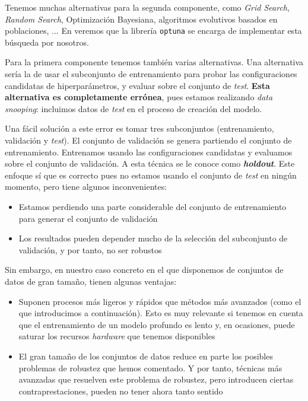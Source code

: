 Tenemos muchas alternativas para la segunda componente, como \textit{Grid Search}, \textit{Random Search}, Optimización Bayesiana, algoritmos evolutivos basados en poblaciones, ... \cite{informatica:review_algoritmos_hp} En  veremos que la librería \lstinline{optuna} se encarga de implementar esta búsqueda por nosotros.

Para la primera componente tenemos también varias alternativas. Una alternativa sería la de usar el subconjunto de entrenamiento para probar las configuraciones candidatas de hiperparámetros, y evaluar sobre el conjunto de \textit{test}. \textbf{Esta alternativa es completamente errónea}, pues estamos realizando \textit{data snooping}: incluimos datos de \textit{test} en el proceso de creación del modelo.

Una fácil solución a este error es tomar tres subconjuntos (entrenamiento, validación y \textit{test}). El conjunto de validación se genera partiendo el conjunto de entrenamiento. Entrenamos usando las configuraciones candidatas y evaluamos sobre el conjunto de validación. A esta técnica se le conoce como \textbf{\textit{holdout}}. Este enfoque sí que es correcto pues no estamos usando el conjunto de \textit{test} en ningún momento, pero tiene algunos inconvenientes:

\begin{itemize}
    \item Estamos perdiendo una parte considerable del conjunto de entrenamiento para generar el conjunto de validación
    \item Los resultados pueden depender mucho de la selección del subconjunto de validación, y por tanto, no ser robustos
\end{itemize}

Sin embargo, en nuestro caso concreto en el que disponemos de conjuntos de datos de gran tamaño, tienen algunas ventajas:

\begin{itemize}
    \item Suponen procesos más ligeros y rápidos que métodos más avanzados (como el que introducimos a continuación). Esto es muy relevante si tenemos en cuenta que el entrenamiento de un modelo profundo es lento y, en ocasiones, puede saturar los recursos \textit{hardware} que tenemos disponibles
    \item El gran tamaño de los conjuntos de datos reduce en parte los posibles problemas de robustez que hemos comentado. Y por tanto, técnicas más avanzadas que resuelven este problema de robustez, pero introducen ciertas contraprestaciones, pueden no tener ahora tanto sentido
\end{itemize}

